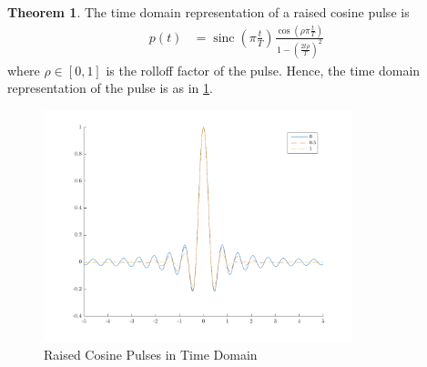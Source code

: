 \documentclass[titlepage, fleqn, a4paper, 12pt, twoside]{article}
\theoremstyle{definition}
\theoremstyle{theorem}
\newtheorem{theorem}{Theorem}
\DeclareMathOperator{\sinc}{\mathrm{sinc}}
\begin{document}
\begin{theorem}
	The time domain representation of a raised cosine pulse is
	\begin{align*}
		p(t) &= \sinc\left( \pi \frac{t}{T} \right) \frac{\cos\left( \rho \pi \frac{t}{T} \right)}{1 - \left( \frac{2 t \rho}{T} \right)^2}
	\end{align*}
	where $\rho \in [0,1]$ is the rolloff factor of the pulse.
	Hence, the time domain representation of the pulse is as in \cref{fig:raised_cosine_pulse_in_time_domain}.
	\begin{figure}[H]
		\centering
		\includegraphics[width = 0.8\textwidth]{./Plots/raised_cosine_pulses_in_time.pdf}
		\caption{Raised Cosine Pulses in Time Domain}
		\label{fig:raised_cosine_pulse_in_time_domain}
	\end{figure}
\end{theorem}
\end{document}
